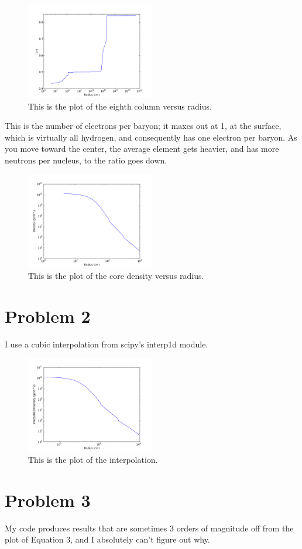 \documentclass[11pt,letterpaper]{article}
\begin{document}
\begin{figure}[bth]
\centering
\includegraphics[width=0.5\textwidth]{EighthColumn}
\caption{This is the plot of the eighth column versus radius.}
\label{fig:simpleplot}
\end{figure}

This is the number of electrons per baryon; it maxes out at 1, at the surface, which is virtually all hydrogen, and consequently has one electron per baryon. As you move toward the center, the average element gets heavier, and has more neutrons per nucleus, to the ratio goes down.

\begin{figure}[bth]
\centering
\includegraphics[width=0.5\textwidth]{Density-Radius}
\caption{This is the plot of the core density versus radius.}
\label{fig:simpleplot}
\end{figure}

\section*{Problem 2}

I use a cubic interpolation from scipy's interp1d module.

\begin{figure}[bth]
\centering
\includegraphics[width=0.5\textwidth]{Interpolation}
\caption{This is the plot of the interpolation.}
\label{fig:simpleplot}
\end{figure}

\section*{Problem 3}

My code produces results that are sometimes 3 orders of magnitude off from the plot of Equation 3, and I absolutely can't figure out why. 
\end{document}
